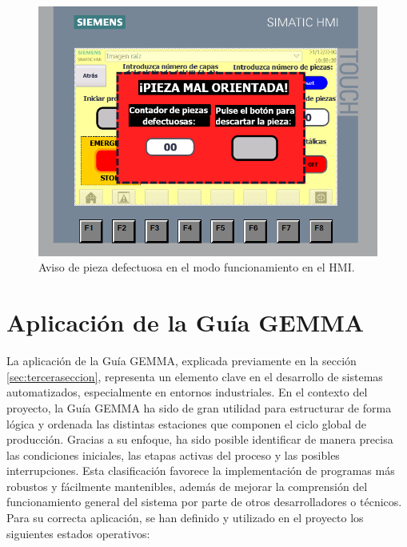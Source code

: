 \begin{figure}[h!]
  \includegraphics[width=15cm]{figs/HMI_descarte}
  \caption{\centering Aviso de pieza defectuosa en el modo funcionamiento en el HMI.}
  \label{fig:HMI_descarte}
\end{figure}

\section{Aplicación de la Guía GEMMA}
\label{sec:aplicacion_gemma}

La aplicación de la Guía GEMMA, explicada previamente en la sección \ref{sec:terceraseccion}, representa un elemento clave en el desarrollo de sistemas automatizados, especialmente en entornos industriales. En el contexto del proyecto, la Guía GEMMA ha sido de gran utilidad para estructurar de forma lógica y ordenada las distintas estaciones que componen el ciclo global de producción. Gracias a su enfoque, ha sido posible identificar de manera precisa las condiciones iniciales, las etapas activas del proceso y las posibles interrupciones. Esta clasificación favorece la implementación de programas más robustos y fácilmente mantenibles, además de mejorar la comprensión del funcionamiento general del sistema por parte de otros desarrolladores o técnicos. Para su correcta aplicación, se han definido y utilizado en el proyecto los siguientes estados operativos:

